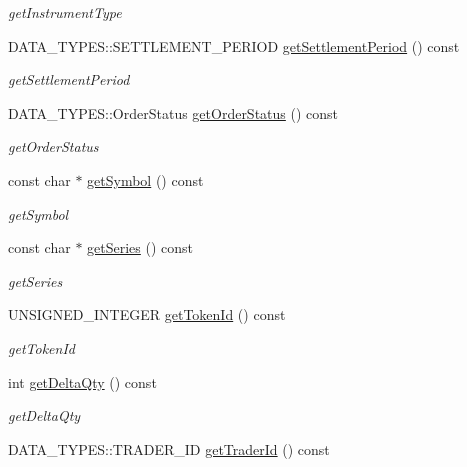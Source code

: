 \begin{DoxyCompactItemize}
\begin{DoxyCompactList}\small\item\em get\-Instrument\-Type \end{DoxyCompactList}\item 
D\-A\-T\-A\-\_\-\-T\-Y\-P\-E\-S\-::\-S\-E\-T\-T\-L\-E\-M\-E\-N\-T\-\_\-\-P\-E\-R\-I\-O\-D \hyperlink{class_a_p_i2_1_1_single_order_a7009cc58bb0799fc898066ac16b29b72}{get\-Settlement\-Period} () const 
\begin{DoxyCompactList}\small\item\em get\-Settlement\-Period \end{DoxyCompactList}\item 
D\-A\-T\-A\-\_\-\-T\-Y\-P\-E\-S\-::\-Order\-Status \hyperlink{class_a_p_i2_1_1_single_order_a7a4c30c1de34991c557cfc62fefef68b}{get\-Order\-Status} () const 
\begin{DoxyCompactList}\small\item\em get\-Order\-Status \end{DoxyCompactList}\item 
const char $\ast$ \hyperlink{class_a_p_i2_1_1_single_order_a705bb6400ace761dcb7b47a6eb26492c}{get\-Symbol} () const 
\begin{DoxyCompactList}\small\item\em get\-Symbol \end{DoxyCompactList}\item 
const char $\ast$ \hyperlink{class_a_p_i2_1_1_single_order_a7535e0a3966d49f1ddf68bd87b174be1}{get\-Series} () const 
\begin{DoxyCompactList}\small\item\em get\-Series \end{DoxyCompactList}\item 
U\-N\-S\-I\-G\-N\-E\-D\-\_\-\-I\-N\-T\-E\-G\-E\-R \hyperlink{class_a_p_i2_1_1_single_order_a20a7f85ee7070d46c5d8b815ed638839}{get\-Token\-Id} () const 
\begin{DoxyCompactList}\small\item\em get\-Token\-Id \end{DoxyCompactList}\item 
int \hyperlink{class_a_p_i2_1_1_single_order_afa73822430c2742cd2c0a3b1d087e087}{get\-Delta\-Qty} () const 
\begin{DoxyCompactList}\small\item\em get\-Delta\-Qty \end{DoxyCompactList}\item 
D\-A\-T\-A\-\_\-\-T\-Y\-P\-E\-S\-::\-T\-R\-A\-D\-E\-R\-\_\-\-I\-D \hyperlink{class_a_p_i2_1_1_single_order_a1721ebefc518df8a2778abae9d604d4b}{get\-Trader\-Id} () const 

\end{DoxyCompactItemize}
